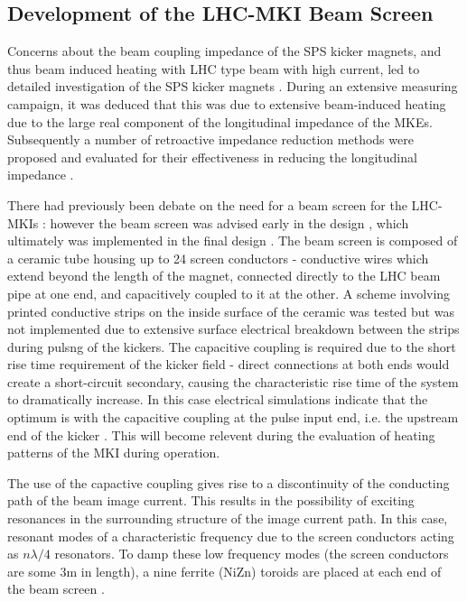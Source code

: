 \subsection{Development of the LHC-MKI Beam Screen}
\label{sec:mki-screen-development}

Concerns about the beam coupling impedance of the SPS kicker magnets, and thus beam induced heating with LHC type beam with high current, led to detailed investigation of the SPS kicker magnets \cite{Arduini:beamInducedSPS}. During an extensive measuring campaign, it was deduced that this was due to extensive beam-induced heating due to the large real component of the longitudinal impedance of the MKEs. Subsequently a number of retroactive impedance reduction methods were proposed and evaluated for their effectiveness in reducing the longitudinal impedance \cite{Kroyer:MKEReduct}.

There had previously been debate on the need for a beam screen for the LHC-MKIs \cite{Vos:beamScreen}: however the beam screen was advised early in the design \cite{Ducimetiere:designMKI}, which ultimately was implemented in the final design \cite{Barnes:improvBeamScreen}. The beam screen is composed of a ceramic tube housing up to 24 screen conductors - conductive wires which extend beyond the length of the magnet, connected directly to the LHC beam pipe at one end, and capacitively coupled to it at the other. A scheme involving printed conductive strips on the inside surface of the ceramic was tested but was not implemented due to extensive surface electrical breakdown between the strips during pulsng of the kickers. The capacitive coupling is required due to the short rise time requirement of the kicker field - direct connections at both ends would create a short-circuit secondary, causing the characteristic rise time of the system to dramatically increase. In this case electrical simulations indicate that the optimum is with the capacitive coupling at the pulse input end, i.e. the upstream end of the kicker \cite{Barnes:improvBeamScreen}. This will become relevent during the evaluation of heating patterns of the MKI during operation.

The use of the capactive coupling gives rise to a discontinuity of the conducting path of the beam image current. This results in the possibility of exciting resonances in the surrounding structure of the image current path. In this case, resonant modes of a characteristic frequency due to the screen conductors acting as $n \lambda /4$ resonators. To damp these low frequency modes (the screen conductors are some 3m in length), a nine ferrite (NiZn) toroids are placed at each end of the beam screen \cite{Caspers:impMeasMKI, Caspera:impMeasLowFreqMKI, Caspers:impMeasMKI, Barnes:mkiVacTemp}. 

